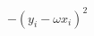 \documentclass[preview]{standalone}
\begin{document}
\begin{align*}
-(y_i- \omega x_i)^2
\end{align*}
\end{document}
